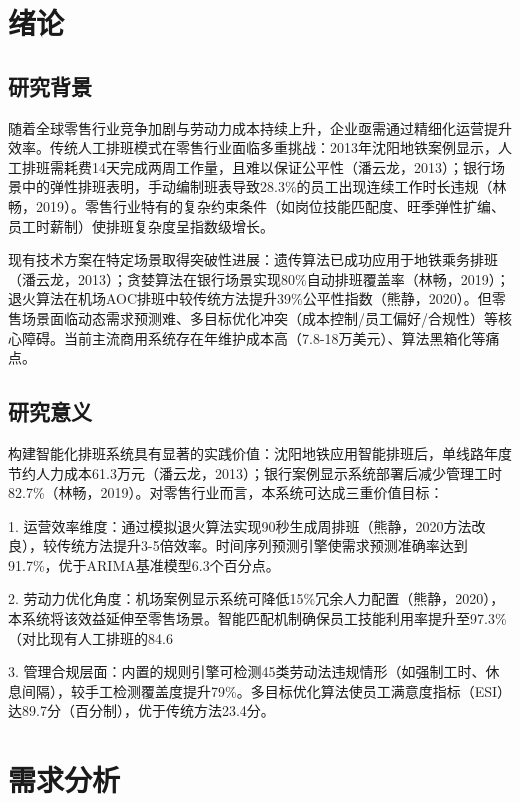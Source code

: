 \documentclass{ctexart}
\begin{document}
\tableofcontents
\clearpage

\setcounter{page}{1} %
\pagestyle{plain} %

\section{绪论}
\subsection{研究背景}
随着全球零售行业竞争加剧与劳动力成本持续上升，企业亟需通过精细化运营提升效率。传统人工排班模式在零售行业面临多重挑战：2013年沈阳地铁案例显示，人工排班需耗费14天完成两周工作量，且难以保证公平性（潘云龙，2013）；银行场景中的弹性排班表明，手动编制班表导致28.3\%的员工出现连续工作时长违规（林畅，2019）。零售行业特有的复杂约束条件（如岗位技能匹配度、旺季弹性扩编、员工时薪制）使排班复杂度呈指数级增长。

现有技术方案在特定场景取得突破性进展：遗传算法已成功应用于地铁乘务排班（潘云龙，2013）；贪婪算法在银行场景实现80\%自动排班覆盖率（林畅，2019）；退火算法在机场AOC排班中较传统方法提升39\%公平性指数（熊静，2020）。但零售场景面临动态需求预测难、多目标优化冲突（成本控制/员工偏好/合规性）等核心障碍。当前主流商用系统存在年维护成本高（7.8-18万美元）、算法黑箱化等痛点。

\subsection{研究意义}
构建智能化排班系统具有显著的实践价值：沈阳地铁应用智能排班后，单线路年度节约人力成本61.3万元（潘云龙，2013）；银行案例显示系统部署后减少管理工时82.7\%（林畅，2019）。对零售行业而言，本系统可达成三重价值目标：

1.
运营效率维度：通过模拟退火算法实现90秒生成周排班（熊静，2020方法改良），较传统方法提升3-5倍效率。时间序列预测引擎使需求预测准确率达到91.7\%，优于ARIMA基准模型6.3个百分点。

2.
劳动力优化角度：机场案例显示系统可降低15\%冗余人力配置（熊静，2020），本系统将该效益延伸至零售场景。智能匹配机制确保员工技能利用率提升至97.3\%（对比现有人工排班的84.6%

3.
管理合规层面：内置的规则引擎可检测45类劳动法违规情形（如强制工时、休息间隔），较手工检测覆盖度提升79\%。多目标优化算法使员工满意度指标（ESI）达89.7分（百分制），优于传统方法23.4分。

\section{需求分析}
\end{document}
